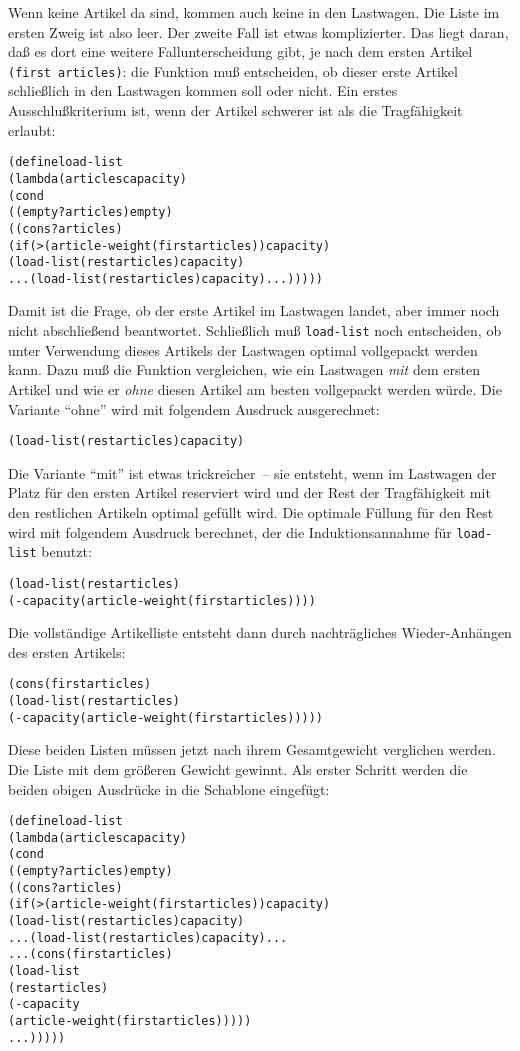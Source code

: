 %
Wenn keine Artikel da sind, kommen
auch keine in den Lastwagen.  Die Liste im ersten Zweig ist also leer.  Der
zweite Fall ist etwas komplizierter.
Das liegt daran, daß es dort
eine weitere Fallunterscheidung gibt, je nach dem ersten Artikel
\texttt{(first articles)}:
die Funktion muß entscheiden, ob dieser erste
Artikel schließlich in den Lastwagen kommen soll oder nicht.
Ein erstes Ausschlußkriterium ist, wenn der Artikel schwerer ist als die
Tragfähigkeit erlaubt:
%
\begin{alltt}
(define load-list
  (lambda (articles capacity)
    (cond
     ((empty? articles) empty)
     ((cons? articles)
        (if (> (article-weight (first articles)) capacity)
            (load-list (rest articles) capacity)
            ... (load-list (rest articles) capacity) ...)))))
\end{alltt}
%
Damit ist die Frage, ob der erste Artikel im Lastwagen landet, aber immer
noch nicht abschließend beantwortet.  Schließlich muß
\texttt{load-list} noch entscheiden, ob unter Verwendung dieses
Artikels der Lastwagen optimal vollgepackt werden
kann.  Dazu muß die Funktion vergleichen, wie ein Lastwagen \emph{mit}
dem ersten Artikel und wie er \emph{ohne} diesen Artikel am besten
vollgepackt werden würde.   Die Variante "`ohne"' wird mit folgendem
Ausdruck ausgerechnet:
%
\begin{alltt}
  (load-list (rest articles) capacity)
\end{alltt}
%
Die Variante "`mit"' ist etwas trickreicher~-- sie entsteht, wenn im
Lastwagen der Platz für den ersten Artikel reserviert wird und
der Rest der Tragfähigkeit mit den restlichen Artikeln optimal gefüllt wird.
Die optimale Füllung für den Rest wird mit folgendem Ausdruck
berechnet, der die Induktionsannahme für \texttt{load-list} benutzt:
%
\begin{alltt}
  (load-list (rest articles) 
                 (- capacity (article-weight (first articles))))
\end{alltt}
%
Die vollständige Artikelliste entsteht dann durch nachträgliches
Wieder-Anhängen des ersten Artikels:
%
\begin{alltt}
  (cons (first articles)
             (load-list (rest articles)
                            (- capacity (article-weight (first articles)))))
\end{alltt}
%
Diese beiden Listen müssen jetzt nach ihrem Gesamtgewicht verglichen
werden.  Die Liste mit dem größeren Gewicht gewinnt.  Als erster
Schritt werden die beiden obigen Ausdrücke in die Schablone eingefügt:
%
\begin{alltt}
(define load-list
  (lambda (articles capacity)
    (cond
     ((empty? articles) empty)
     ((cons? articles)
        (if (> (article-weight (first articles)) capacity)
            (load-list (rest articles) capacity)
            ... (load-list (rest articles) capacity) ...
            ... (cons (first articles)
                           (load-list
                             (rest articles)
                             (- capacity
                                (article-weight (first articles)))))
            ...)))))
\end{alltt}
